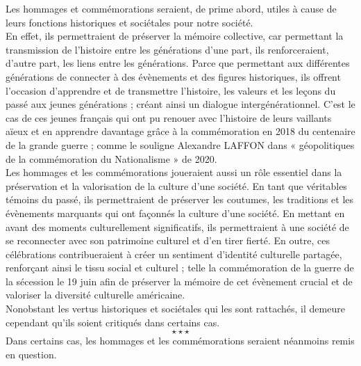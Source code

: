 \hspace*{0.5cm}Les hommages et commémorations seraient, de prime abord, utiles à cause de leurs fonctions historiques et sociétales pour notre société.\\
\hspace*{0.5cm}En effet, ils permettraient de préserver la mémoire collective, car permettant la transmission de l’histoire entre les générations d’une part, ils renforceraient, d’autre part, les liens entre les générations. Parce que permettant aux différentes générations de connecter à des évènements et des figures historiques, ils offrent l’occasion d’apprendre et de transmettre l’histoire, les valeurs et les leçons du passé aux jeunes générations ; créant ainsi un dialogue intergénérationnel. C’est le cas de ces jeunes français qui ont pu renouer avec l’histoire de leurs vaillants aïeux et en apprendre davantage grâce à la commémoration en 2018 du centenaire de la grande guerre ; comme le souligne Alexandre LAFFON dans « géopolitiques de la commémoration du Nationalisme » de 2020.\\
\hspace*{0.5cm}Les hommages et les commémorations joueraient aussi un rôle essentiel dans la préservation et la valorisation de la culture d’une société. En tant que véritables témoins du passé, ils permettraient de préserver les coutumes, les traditions et les évènements marquants qui ont façonnés la culture d’une société. En mettant en avant des moments culturellement significatifs, ils permettraient à une société de se reconnecter avec son patrimoine culturel et d’en tirer fierté. En outre, ces célébrations contribueraient à créer un sentiment d’identité culturelle partagée, renforçant ainsi le tissu social et culturel ; telle la commémoration de la guerre de la sécession le 19 juin afin de préserver la mémoire de cet évènement crucial et de valoriser la diversité culturelle américaine. \\
\hspace*{0.5cm}Nonobstant les vertus historiques et sociétales qui les sont rattachés, il demeure cependant qu’ils soient critiqués dans certains cas.
$$\star \star \star$$
\hspace*{0.5cm}Dans certains cas, les hommages et les commémorations seraient néanmoins remis en question.\\
